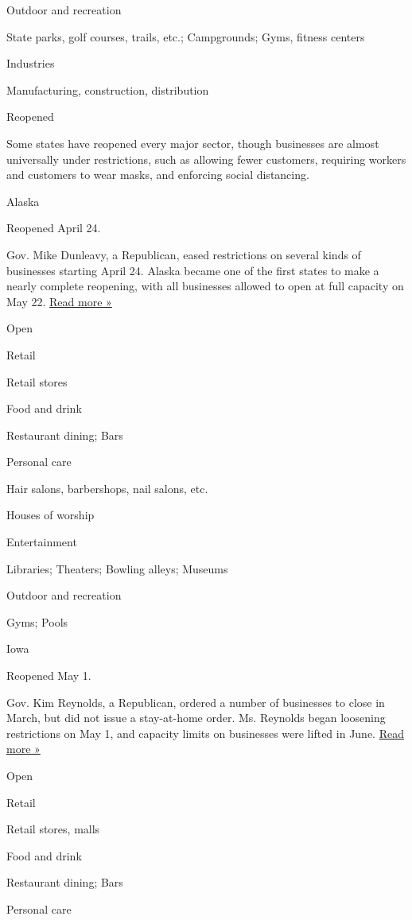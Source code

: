 Outdoor and recreation

State parks, golf courses, trails, etc.; Campgrounds; Gyms, fitness
centers

Industries

Manufacturing, construction, distribution

Reopened

Some states have reopened every major sector, though businesses are
almost universally under restrictions, such as allowing fewer customers,
requiring workers and customers to wear masks, and enforcing social
distancing.

Alaska

Reopened April 24.

Gov. Mike Dunleavy, a Republican, eased restrictions on several kinds of
businesses starting April 24. Alaska became one of the first states to
make a nearly complete reopening, with all businesses allowed to open at
full capacity on May 22.
\href{https://www.cnn.com/2020/05/21/us/alaska-reopening-friday/index.html}{Read
more »}

Open

Retail

Retail stores

Food and drink

Restaurant dining; Bars

Personal care

Hair salons, barbershops, nail salons, etc.

Houses of worship

Entertainment

Libraries; Theaters; Bowling alleys; Museums

Outdoor and recreation

Gyms; Pools

Iowa

Reopened May 1.

Gov. Kim Reynolds, a Republican, ordered a number of businesses to close
in March, but did not issue a stay-at-home order. Ms. Reynolds began
loosening restrictions on May 1, and capacity limits on businesses were
lifted in June.
\href{https://ktiv.com/2020/06/10/watch-live-gov-reynolds-hold-news-conference-on-covid-19/}{Read
more »}

Open

Retail

Retail stores, malls

Food and drink

Restaurant dining; Bars

Personal care

